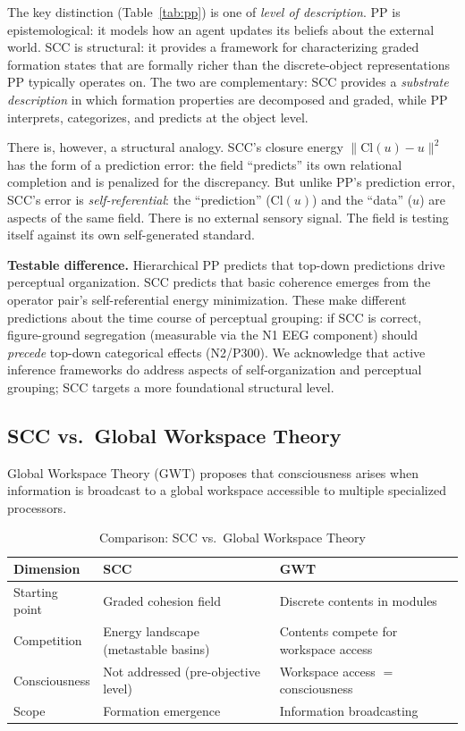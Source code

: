 \documentclass[lettersize,journal]{IEEEtran}
\begin{document}
The key distinction (Table~\ref{tab:pp}) is one of \emph{level of description}. PP is epistemological: it models how an agent updates its beliefs about the external world. SCC is structural: it provides a framework for characterizing graded formation states that are formally richer than the discrete-object representations PP typically operates on. The two are complementary: SCC provides a \emph{substrate description} in which formation properties are decomposed and graded, while PP interprets, categorizes, and predicts at the object level.

There is, however, a structural analogy. SCC's closure energy $\|\mathrm{Cl}(u) - u\|^2$ has the form of a prediction error: the field ``predicts'' its own relational completion and is penalized for the discrepancy. But unlike PP's prediction error, SCC's error is \emph{self-referential}: the ``prediction'' ($\mathrm{Cl}(u)$) and the ``data'' ($u$) are aspects of the same field. There is no external sensory signal. The field is testing itself against its own self-generated standard.

\textbf{Testable difference.} Hierarchical PP predicts that top-down predictions drive perceptual organization. SCC predicts that basic coherence emerges from the operator pair's self-referential energy minimization. These make different predictions about the time course of perceptual grouping: if SCC is correct, figure-ground segregation (measurable via the N1 EEG component) should \emph{precede} top-down categorical effects (N2/P300). We acknowledge that active inference frameworks \cite{friston2010free} do address aspects of self-organization and perceptual grouping; SCC targets a more foundational structural level.

\subsection{SCC vs.\ Global Workspace Theory}

Global Workspace Theory (GWT) \cite{baars1988cognitive,dehaene2011experimental} proposes that consciousness arises when information is broadcast to a global workspace accessible to multiple specialized processors.

\begin{table}[!t]
\centering
\caption{Comparison: SCC vs.\ Global Workspace Theory}
\label{tab:gwt}
\begin{tabular}{p{2.2cm}p{2.8cm}p{2.5cm}}
\toprule
\textbf{Dimension} & \textbf{SCC} & \textbf{GWT} \\
\midrule
Starting point & Graded cohesion field & Discrete contents in modules \\
\addlinespace
Competition & Energy landscape (metastable basins) & Contents compete for workspace access \\
\addlinespace
Consciousness & Not addressed (pre-objective level) & Workspace access $=$ consciousness \\
\addlinespace
Scope & Formation emergence & Information broadcasting \\
\bottomrule
\end{tabular}
\end{table}
\end{document}

